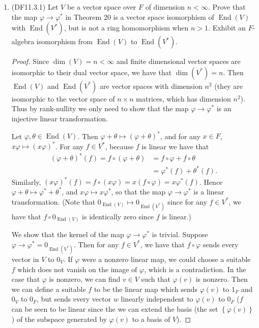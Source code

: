 \documentclass[11pt]{article}
\newcommand{\cbr}[1]{\left\{#1\right\}}
\DeclareMathOperator{\End}{End}
\begin{document}
\begin{enumerate}
    \item (DF11.3.1) Let $V$ be a vector space over $F$ of dimension $n<\infty$. Prove that the map $\varphi\to\varphi^\ast$ in Theorem 20 is a vector space isomorphism of $\End(V)$ with $\End(V^\ast)$, but is not a ring homomorphism when $n>1$. Exhibit an $F$-algebra isomorphism from $\End(V)$ to $\End(V^\ast)$. \begin{proof}
        Since $\dim(V) = n<\infty$ and finite dimensional vector spaces are isomorphic to their dual vector space, we have that $\dim(V^\ast) = n$. Then $\End(V)$ and $\End(V^\ast)$ are vector spaces with dimension $n^2$ (they are isomorphic to the vector space of $n\times n$ matrices, which has dimension $n^2$). Thus by rank-nullity we only need to show that the map $\varphi\to\varphi^\ast$ is an injective linear transformation. 

        Let $\varphi,\theta\in \End(V)$. Then $\varphi + \theta\mapsto(\varphi + \theta)^\ast$, and for any $x\in F$, $x\varphi\mapsto (x\varphi)^\ast$. For any $f\in V^\ast$, because $f$ is linear we have that \begin{align*}
            (\varphi + \theta)^\ast(f) = f\circ(\varphi + \theta) &= f\circ\varphi + f\circ \theta\\
            &= \varphi^\ast(f) + \theta^\ast(f).
        \end{align*} Similarly, $(x\varphi)^\ast(f) = f\circ(x\varphi) = x(f\circ\varphi) = x\varphi^\ast(f)$. Hence $\varphi + \theta\mapsto\varphi^\ast + \theta^\ast$, and $x\varphi\mapsto x\varphi^\ast$, so that the map $\varphi\to\varphi^\ast$ is a linear transformation. (Note that $0_{\End(V)}\mapsto 0_{\End(V^\ast)}$ since for any $f\in V^\ast$, we have that $f\circ 0_{\End(V)}$ is identically zero since $f$ is linear.)

        We show that the kernel of the map $\varphi\to\varphi^\ast$ is trivial. Suppose $\varphi\to\varphi^\ast = 0_{\End(V^\ast)}$. Then for any $f\in V^\ast$, we have that $f\circ \varphi$ sends every vector in $V$ to $0_V$. If $\varphi$ were a nonzero linear map, we could choose a suitable $f$ which does not vanish on the image of $\varphi$, which is a contradiction. In the case that $\varphi$ is nonzero, we can find $v\in V$ such that $\varphi(v)$ is nonzero. Then we can define a suitable $f$ to be the linear map which sends $\varphi(v)$ to $1_F$ and $0_V$ to $0_F$, but sends every vector $w$ linearly independent to $\varphi(v)$ to $0_F$ ($f$ can be seen to be linear since the we can extend the basis (the set $\cbr{\varphi(v)}$) of the subspace generated by $\varphi(v)$ to a basis of $V$).
        

\end{proof}
\end{enumerate}
\end{document}
